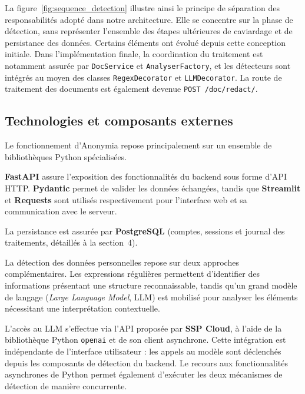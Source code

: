 \documentclass[12pt,a4paper]{article}
\begin{document}
La figure~\ref{fig:sequence_detection} illustre ainsi le principe de séparation des responsabilités adopté dans notre architecture. Elle se concentre sur la phase de détection, sans représenter l'ensemble des étapes ultérieures de caviardage et de persistance des données. Certains éléments ont évolué depuis cette conception initiale. Dans l'implémentation finale, la coordination du traitement est notamment assurée par \texttt{DocService} et \texttt{AnalyserFactory}, et les détecteurs sont intégrés au moyen des classes \texttt{RegexDecorator} et \texttt{LLMDecorator}. La route de traitement des documents est également devenue \texttt{POST /doc/redact/}.



\subsection{Technologies et composants externes}

Le fonctionnement d'Anonymia repose principalement sur un ensemble de bibliothèques Python spécialisées.

\textbf{FastAPI} assure l'exposition des fonctionnalités du backend sous forme d'API HTTP. \textbf{Pydantic} permet de valider les données échangées, tandis que \textbf{Streamlit} et \textbf{Requests} sont utilisés respectivement pour l'interface web et sa communication avec le serveur.

La persistance est assurée par \textbf{PostgreSQL} (comptes, sessions et journal des traitements, détaillés à la section~4).

La détection des données personnelles repose sur deux approches complémentaires. Les expressions régulières permettent d'identifier des informations présentant une structure reconnaissable, tandis qu'un grand modèle de langage (\textit{Large Language Model}, LLM) est mobilisé pour analyser les éléments nécessitant une interprétation contextuelle.

L'accès au LLM s'effectue via l'API proposée par \textbf{SSP Cloud}, à l'aide de la bibliothèque Python \texttt{openai} et de son client asynchrone. Cette intégration est indépendante de l'interface utilisateur : les appels au modèle sont déclenchés depuis les composants de détection du backend. Le recours aux fonctionnalités asynchrones de Python permet également d'exécuter les deux mécanismes de détection de manière concurrente.
\end{document}
